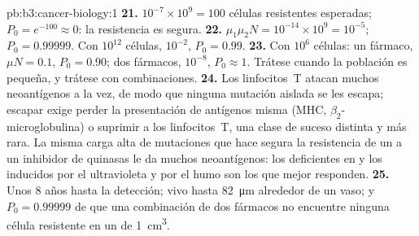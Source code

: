 \begin{solution}{pb:b3:cancer-biology:1}
\textbf{21.} $10^{-7}\times 10^{9} = 100$ células resistentes esperadas;
$P_{0} = e^{-100} \approx 0$: la resistencia es segura.
\textbf{22.} $\mu_{1}\mu_{2}N = 10^{-14}\times 10^{9} = 10^{-5}$;
$P_{0} = 0.99999$. Con $10^{12}$ células, $10^{-2}$, $P_{0} = 0.99$.
\textbf{23.} Con $10^{6}$ células: un fármaco, $\mu N = 0.1$,
$P_{0} = 0.90$; dos fármacos, $10^{-8}$, $P_{0} \approx 1$. Trátese
cuando la población es pequeña, y trátese con combinaciones.
\textbf{24.} Los linfocitos~T atacan muchos neoantígenos a la vez, de
modo que ninguna mutación aislada se les escapa; escapar exige perder la
presentación de antígenos misma (MHC, $\beta_{2}$-microglobulina) o
suprimir a los linfocitos~T, una clase de suceso distinta y más rara. La
misma carga alta de mutaciones que hace segura la resistencia de un 
a un inhibidor de quinasas le da muchos neoantígenos: los 
deficientes en  y los inducidos por
el ultravioleta y por el humo son los que mejor responden.
\textbf{25.} Unos $8$ años hasta la detección;  vivo hasta
\qty{82}{\micro m} alrededor de un vaso; y $P_{0} = 0.99999$ de que una
combinación de dos fármacos no encuentre ninguna célula resistente en un
 de \qty{1}{cm^3}.
\end{solution}
